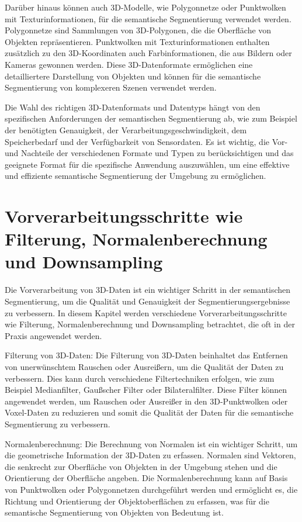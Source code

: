 Darüber hinaus können auch 3D-Modelle, wie Polygonnetze oder Punktwolken mit
Texturinformationen, für die semantische Segmentierung verwendet werden.
Polygonnetze sind Sammlungen von 3D-Polygonen, die die Oberfläche von Objekten
repräsentieren. Punktwolken mit Texturinformationen enthalten zusätzlich zu den
3D-Koordinaten auch Farbinformationen, die aus Bildern oder Kameras gewonnen
werden. Diese 3D-Datenformate ermöglichen eine detailliertere Darstellung von
Objekten und können für die semantische Segmentierung von komplexeren Szenen
verwendet werden.

Die Wahl des richtigen 3D-Datenformats und Datentyps hängt von den spezifischen
Anforderungen der semantischen Segmentierung ab, wie zum Beispiel der
benötigten Genauigkeit, der Verarbeitungsgeschwindigkeit, dem Speicherbedarf
und der Verfügbarkeit von Sensordaten. Es ist wichtig, die Vor- und Nachteile
der verschiedenen Formate und Typen zu berücksichtigen und das geeignete Format
für die spezifische Anwendung auszuwählen, um eine effektive und effiziente
semantische Segmentierung der Umgebung zu ermöglichen.

\section{Vorverarbeitungsschritte wie Filterung, Normalenberechnung und Downsampling}

Die Vorverarbeitung von 3D-Daten ist ein wichtiger Schritt in der semantischen
Segmentierung, um die Qualität und Genauigkeit der Segmentierungsergebnisse zu
verbessern. In diesem Kapitel werden verschiedene Vorverarbeitungsschritte wie
Filterung, Normalenberechnung und Downsampling betrachtet, die oft in der
Praxis angewendet werden.

Filterung von 3D-Daten: Die Filterung von 3D-Daten beinhaltet das Entfernen von
unerwünschtem Rauschen oder Ausreißern, um die Qualität der Daten zu
verbessern. Dies kann durch verschiedene Filtertechniken erfolgen, wie zum
Beispiel Medianfilter, Gaußscher Filter oder Bilateralfilter. Diese Filter
können angewendet werden, um Rauschen oder Ausreißer in den 3D-Punktwolken oder
Voxel-Daten zu reduzieren und somit die Qualität der Daten für die semantische
Segmentierung zu verbessern.

Normalenberechnung: Die Berechnung von Normalen ist ein wichtiger Schritt, um
die geometrische Information der 3D-Daten zu erfassen. Normalen sind Vektoren,
die senkrecht zur Oberfläche von Objekten in der Umgebung stehen und die
Orientierung der Oberfläche angeben. Die Normalenberechnung kann auf Basis von
Punktwolken oder Polygonnetzen durchgeführt werden und ermöglicht es, die
Richtung und Orientierung der Objektoberflächen zu erfassen, was für die
semantische Segmentierung von Objekten von Bedeutung ist.

